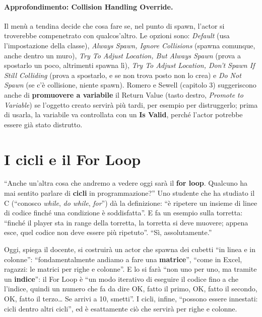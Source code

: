 \paragraph{Approfondimento: Collision Handling Override.} Il menù a tendina decide che
cosa fare se, nel punto di spawn, l'actor si troverebbe compenetrato con qualcos'altro.
Le opzioni sono: \emph{Default} (usa l'impostazione della classe), \emph{Always Spawn,
Ignore Collisions} (spawna comunque, anche dentro un muro), \emph{Try To Adjust
Location, But Always Spawn} (prova a spostarlo un poco, altrimenti spawna lì),
\emph{Try To Adjust Location, Don't Spawn If Still Colliding} (prova a spostarlo, e se
non trova posto non lo crea) e \emph{Do Not Spawn} (se c'è collisione, niente spawn).
Romero e Sewell (capitolo 3) suggeriscono anche di \textbf{promuovere a variabile} il
Return Value (tasto destro, \emph{Promote to Variable}) se l'oggetto creato servirà più
tardi, per esempio per distruggerlo; prima di usarla, la variabile va controllata con
un \textbf{Is Valid}, perché l'actor potrebbe essere già stato distrutto.

\section{I cicli e il For Loop}
\label{ue5:sec:cicli}

``Anche un'altra cosa che andremo a vedere oggi sarà il \textbf{for loop}. Qualcuno ha
mai sentito parlare di \textbf{cicli} in programmazione?'' Uno studente che ha studiato
il C (``conosco \emph{while}, \emph{do while}, \emph{for}'') dà la definizione: ``è
ripetere un insieme di linee di codice finché una condizione è soddisfatta''. E fa un
esempio sulla torretta: ``finché il player sta in range della torretta, la torretta si
deve muovere; appena esce, quel codice non deve essere più ripetuto''. ``Sì,
assolutamente.''

Oggi, spiega il docente, si costruirà un actor che spawna dei cubetti ``in linea e in
colonne'': ``fondamentalmente andiamo a fare una \textbf{matrice}'', ``come in Excel,
ragazzi: le matrici per righe e colonne''. E lo si farà ``non uno per uno, ma tramite un
\textbf{indice}'': il For Loop è ``un modo iterativo di eseguire il codice fino a che
l'indice, quindi un numero che fa da dire OK, fatto il primo, OK, fatto il secondo, OK,
fatto il terzo\ldots{} Se arrivi a 10, smetti''. I cicli, infine, ``possono essere
innestati: cicli dentro altri cicli'', ed è esattamente ciò che servirà per righe e
colonne.

